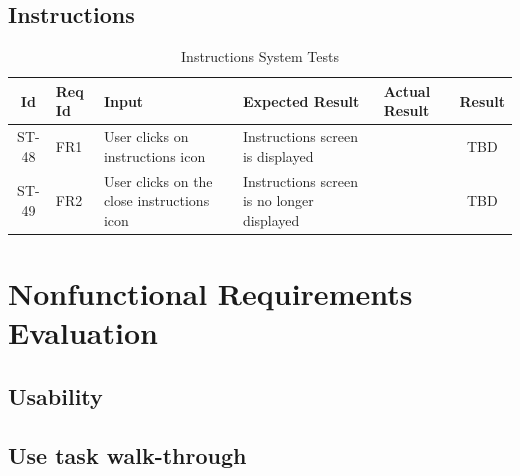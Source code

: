 \documentclass[12pt, titlepage]{article}
\begin{document}
	\subsection{Instructions}
	
	\begin{center}
		\begin{longtable}{|c|p{1cm}|p{2.7cm}|p{3cm}|p{3cm}|c|}
			\caption{Instructions System Tests \label{long}}\\
			\hline
			\textbf{Id} & \textbf{Req Id} & \textbf{Input} & \textbf{Expected Result} & \textbf{Actual Result} & \textbf{Result}   \\
			\hline
			ST-48 & FR1 & User clicks on instructions icon & Instructions screen is displayed & & TBD \\
			\hline
			ST-49 & FR2 & User clicks on the close instructions icon & Instructions screen is no longer displayed & & TBD \\
			\hline
		\end{longtable}
	\end{center}
	
	\newpage
	
	\section{Nonfunctional Requirements Evaluation}
	
	\subsection{Usability}
	
	\subsection{Use task walk-through}
	
\end{document}
